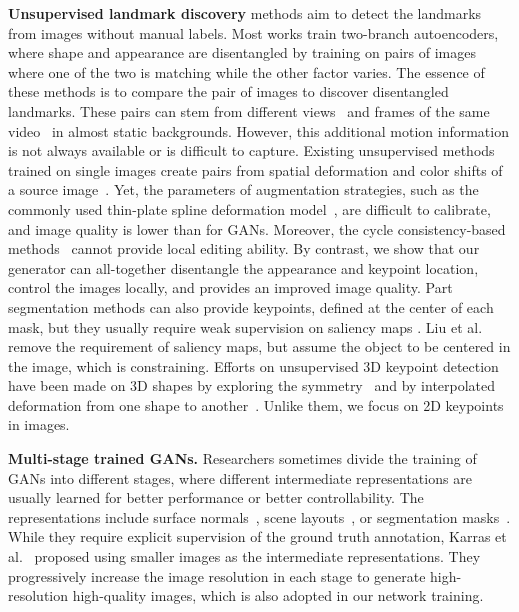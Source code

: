 \documentclass[10pt, conference, compsocconf]{IEEEtran}
\begin{document}
\textbf{Unsupervised landmark discovery} methods aim to detect the landmarks from images without manual labels. Most works train two-branch autoencoders, where shape and appearance are disentangled by training on pairs of images where one of the two is matching while the other factor varies. The essence of these methods is to compare the pair of images to discover disentangled landmarks. These pairs can stem from different views~\cite{suwajanakorn2018discovery, Rhodin_2019_CVPR} and frames of the same video~\cite{siarohin2019animating,siarohin2019first,siarohin2021motion,wang2021one} in almost static backgrounds. However, this additional motion information is not always available or is difficult to capture. Existing unsupervised methods trained on single images create pairs from spatial deformation and color shifts of a source image~\cite{xing2018deformable,shu2018deforming,thewlis2019unsupervised,li2020unsupervised,cheng2020unsupervised,dundar2020unsupervised}. Yet, the parameters of augmentation strategies, such as the commonly used thin-plate spline deformation model~\cite{thewlis2017unsupervised, zhang2018unsupervised,jakab2018unsupervised,lorenz2019unsupervised}, are difficult to calibrate, and image quality is lower than for GANs.
Moreover, the cycle consistency-based methods~\cite{wu2019transgaga, xu2020unsupervised} cannot provide local editing ability. 
By contrast, we show that our generator can all-together disentangle the appearance and keypoint location, control the images locally, and provides an improved image quality. 
Part segmentation methods can also provide keypoints, defined at the center of each mask, but they usually require weak supervision on saliency maps \cite{hung2019scops, NEURIPS2021_ec8ce6ab}. 
Liu et al.~\cite{liu2021unsupervised} remove the requirement of saliency maps, but assume the object to be centered in the image, which is constraining.
Efforts on unsupervised 3D keypoint detection~\cite{fernandez2020unsupervised, jakab2021keypointdeformer} have been made on 3D shapes by exploring the symmetry~\cite{fernandez2020unsupervised} and by interpolated deformation from one shape to another~\cite{jakab2021keypointdeformer}. 
Unlike them, we focus on 2D keypoints in images.



\textbf{Multi-stage trained GANs.} Researchers sometimes divide the training of GANs into different stages, where different intermediate representations are usually learned for better performance or better controllability. The representations include surface normals~\cite{wang2016generative}, scene layouts~\cite{johnson2018image, li2021controllable}, or segmentation masks~\cite{men2020controllable}. While they require explicit supervision of the ground truth annotation, Karras et al.~\cite{karras2018progressive, karras2019style} proposed using smaller images as the intermediate representations. They progressively increase the image resolution in each stage to generate high-resolution high-quality images, which is also adopted in our network training.
\end{document}
